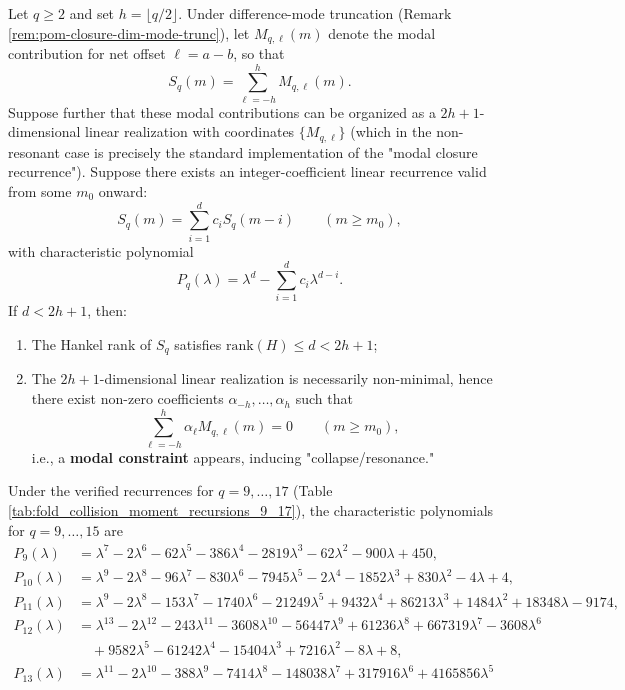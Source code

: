 \begin{theorem}\label{thm:pom-moment-resonance}
Let \(q\ge 2\) and set \(h=\lfloor q/2\rfloor\). Under difference-mode truncation (Remark \ref{rem:pom-closure-dim-mode-trunc}), let \(M_{q,\ell}(m)\) denote the modal contribution for net offset \(\ell=a-b\), so that
$$
S_q(m)=\sum_{\ell=-h}^{h} M_{q,\ell}(m).
$$
Suppose further that these modal contributions can be organized as a \(2h+1\)-dimensional linear realization with coordinates \(\{M_{q,\ell}\}\) (which in the non-resonant case is precisely the standard implementation of the "modal closure recurrence").
Suppose there exists an integer-coefficient linear recurrence valid from some \(m_0\) onward:
$$
S_q(m)=\sum_{i=1}^{d} c_i S_q(m-i)\qquad(m\ge m_0),
$$
with characteristic polynomial
$$
P_q(\lambda)=\lambda^d-\sum_{i=1}^d c_i\lambda^{d-i}.
$$
If \(d<2h+1\), then:
\begin{enumerate}
  \item The Hankel rank of \(S_q\) satisfies \(\mathrm{rank}(H)\le d<2h+1\);
  \item The \(2h+1\)-dimensional linear realization is necessarily non-minimal, hence there exist non-zero coefficients \(\alpha_{-h},\dots,\alpha_h\) such that
  $$
  \sum_{\ell=-h}^{h}\alpha_\ell M_{q,\ell}(m)=0\qquad(m\ge m_0),
  $$
  i.e., a \textbf{modal constraint} appears, inducing "collapse/resonance."
\end{enumerate}
Under the verified recurrences for \(q=9,\dots,17\) (Table \ref{tab:fold_collision_moment_recursions_9_17}), the characteristic polynomials for \(q=9,\dots,15\) are
$$
\begin{aligned}
P_9(\lambda)&=\lambda^7-2\lambda^6-62\lambda^5-386\lambda^4-2819\lambda^3-62\lambda^2-900\lambda+450,\\
P_{10}(\lambda)&=\lambda^9-2\lambda^8-96\lambda^7-830\lambda^6-7945\lambda^5-2\lambda^4-1852\lambda^3+830\lambda^2-4\lambda+4,\\
P_{11}(\lambda)&=\lambda^9-2\lambda^8-153\lambda^7-1740\lambda^6-21249\lambda^5+9432\lambda^4+86213\lambda^3+1484\lambda^2+18348\lambda-9174,
\\
P_{12}(\lambda)&=\lambda^{13}-2\lambda^{12}-243\lambda^{11}-3608\lambda^{10}-56447\lambda^9+61236\lambda^8+667319\lambda^7-3608\lambda^6\\
&\quad+9582\lambda^5-61242\lambda^4-15404\lambda^3+7216\lambda^2-8\lambda+8,\\
P_{13}(\lambda)&=\lambda^{11}-2\lambda^{10}-388\lambda^9-7414\lambda^8-148038\lambda^7+317916\lambda^6+4165856\lambda^5\\

\end{aligned}$$
\end{theorem}
